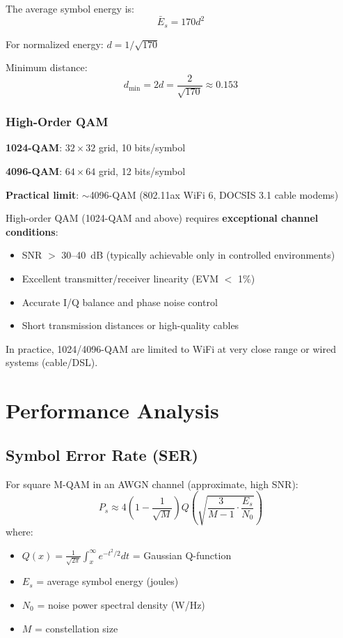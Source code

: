 The average symbol energy is:
\begin{equation}
\bar{E}_s = 170d^2
\label{eq:256qam-energy}
\end{equation}

For normalized energy: $d = 1/\sqrt{170}$

Minimum distance:
\begin{equation}
d_{\min} = 2d = \frac{2}{\sqrt{170}} \approx 0.153
\label{eq:256qam-distance}
\end{equation}

\subsubsection{High-Order QAM}

\textbf{1024-QAM}: $32 \times 32$ grid, 10 bits/symbol

\textbf{4096-QAM}: $64 \times 64$ grid, 12 bits/symbol

\textbf{Practical limit}: $\sim$4096-QAM (802.11ax WiFi 6, DOCSIS 3.1 cable modems)

\begin{warningbox}
High-order QAM (1024-QAM and above) requires \textbf{exceptional channel conditions}:
\begin{itemize}
\item SNR $>$ 30--40~dB (typically achievable only in controlled environments)
\item Excellent transmitter/receiver linearity (EVM $<$ 1\%)
\item Accurate I/Q balance and phase noise control
\item Short transmission distances or high-quality cables
\end{itemize}
In practice, 1024/4096-QAM are limited to WiFi at very close range or wired systems (cable/DSL).
\end{warningbox}

\section{Performance Analysis}

\subsection{Symbol Error Rate (SER)}

For square M-QAM in an AWGN channel (approximate, high SNR):
\begin{equation}
P_s \approx 4\left(1 - \frac{1}{\sqrt{M}}\right) Q\left(\sqrt{\frac{3}{M-1} \cdot \frac{E_s}{N_0}}\right)
\label{eq:qam-ser}
\end{equation}
where:
\begin{itemize}
\item $Q(x) = \frac{1}{\sqrt{2\pi}} \int_x^\infty e^{-t^2/2} dt$ = Gaussian Q-function
\item $E_s$ = average symbol energy (joules)
\item $N_0$ = noise power spectral density (W/Hz)
\item $M$ = constellation size
\end{itemize}

